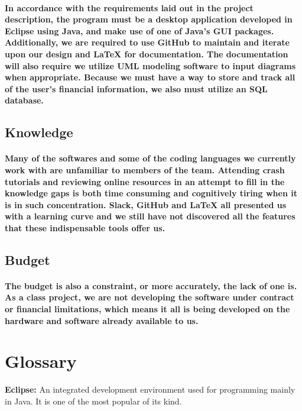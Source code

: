 \documentclass{article}
\begin{document}
\paragraph{\indent In accordance with the requirements laid out in the project description, the program must be a desktop application developed in Eclipse using Java, and make use of one of Java's GUI packages. Additionally, we are required to use GitHub to maintain and iterate upon our design and LaTeX for documentation. The documentation will also require we utilize UML modeling software to input diagrams when appropriate. Because we must have a way to store and track all of the user's financial information, we also must utilize an SQL database.}

\subsection{Knowledge}
\paragraph{\indent Many of the softwares and some of the coding languages we currently work with are unfamiliar to members of the team. Attending crash tutorials and reviewing online resources in an attempt to fill in the knowledge gaps is both time consuming and cognitively tiring when it is in such concentration. Slack, GitHub and LaTeX all presented us with a learning curve and we still have not discovered all the features that these indispensable tools offer us.  }

\subsection{Budget}
\paragraph{\indent The budget is also a constraint, or more accurately, the lack of one is. As a class project, we are not developing the software under contract or financial limitations, which means it all is being developed on the hardware and software already available to us.}


\newpage
\section {Glossary}

\textbf{\indent Eclipse: }An integrated development environment used for programming mainly in Java. It is one of the most popular of its kind.\\
\end{document}
